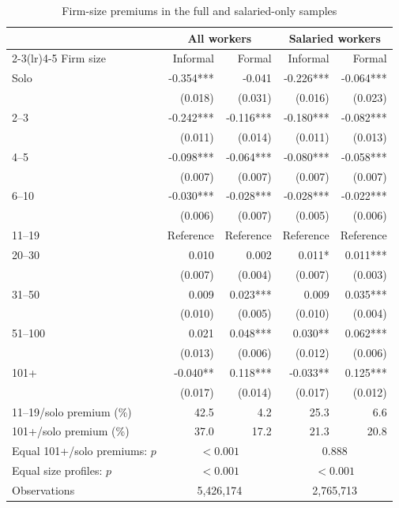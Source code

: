\begin{table}[!htbp]
  \centering
  \caption{Firm-size premiums in the full and salaried-only samples}
  \label{tab:salaried-robustness}
  \small
  \begin{tabular}{lrrrr}
    \toprule
    & \multicolumn{2}{c}{All workers} & \multicolumn{2}{c}{Salaried workers} \\
    \cmidrule(lr){2-3}\cmidrule(lr){4-5}
    Firm size & Informal & Formal & Informal & Formal \\
    \midrule
    Solo & -0.354*** & -0.041 & -0.226*** & -0.064*** \\
     & (0.018) & (0.031) & (0.016) & (0.023) \\
    2--3 & -0.242*** & -0.116*** & -0.180*** & -0.082*** \\
     & (0.011) & (0.014) & (0.011) & (0.013) \\
    4--5 & -0.098*** & -0.064*** & -0.080*** & -0.058*** \\
     & (0.007) & (0.007) & (0.007) & (0.007) \\
    6--10 & -0.030*** & -0.028*** & -0.028*** & -0.022*** \\
     & (0.006) & (0.007) & (0.005) & (0.006) \\
    11--19 & Reference & Reference & Reference & Reference \\
    20--30 & 0.010 & 0.002 & 0.011* & 0.011*** \\
     & (0.007) & (0.004) & (0.007) & (0.003) \\
    31--50 & 0.009 & 0.023*** & 0.009 & 0.035*** \\
     & (0.010) & (0.005) & (0.010) & (0.004) \\
    51--100 & 0.021 & 0.048*** & 0.030** & 0.062*** \\
     & (0.013) & (0.006) & (0.012) & (0.006) \\
    101+ & -0.040** & 0.118*** & -0.033** & 0.125*** \\
     & (0.017) & (0.014) & (0.017) & (0.012) \\
    \midrule
    11--19/solo premium (\%) & 42.5 & 4.2 & 25.3 & 6.6 \\
    101+/solo premium (\%) & 37.0 & 17.2 & 21.3 & 20.8 \\
    Equal 101+/solo premiums: $p$ & \multicolumn{2}{c}{$<0.001$} & \multicolumn{2}{c}{0.888} \\
    Equal size profiles: $p$ & \multicolumn{2}{c}{$<0.001$} & \multicolumn{2}{c}{$<0.001$} \\
    Observations & \multicolumn{2}{c}{5,426,174} & \multicolumn{2}{c}{2,765,713} \\

\end{tabular}
\end{table}
